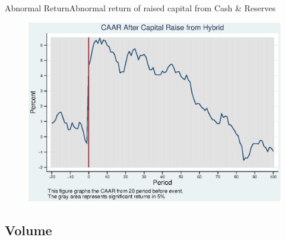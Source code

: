 \documentclass{beamer}
\begin{document}
\begin{frame}{Abnormal Return}{Abnormal return of raised capital from Cash \& Reserves}
\label{abreturnhybrid}
\begin{figure}
\centering
\includegraphics[width=0.65\linewidth]{Output/CARHybrid.eps}
\label{fig:abreturnhybrid}
\end{figure}
\hfill\hyperlink{abreturnhybrid4Factor}{}
\end{frame}


%
%
%
%
%
%
%
%
%

\subsection{Volume}
\end{document}
